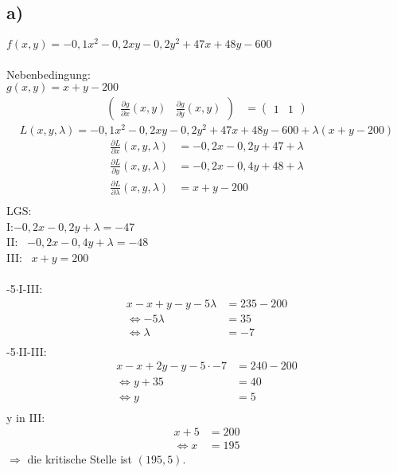 \documentclass[a4paper]{scrartcl}
\begin{document}
\subsection{a)}
\(f(x,y)=-0,1x^2-0,2xy-0,2y^2+47x+48y-600\) \\ \\
Nebenbedingung: \\
\(g(x,y)=x+y-200\) \\
\begin{align}
\begin{pmatrix}
\frac{\partial g}{\partial x}(x,y) & \frac{\partial g}{\partial y}(x,y) 
\end{pmatrix}
&=
\begin{pmatrix}
1 & 1
\end{pmatrix}
\end{align}
\[L(x,y,\lambda)=-0,1x^2-0,2xy-0,2y^2+47x+48y-600+\lambda(x+y-200)\]
\begin{align}
\frac{\partial L}{\partial x}(x,y,\lambda)&=-0,2x-0,2y+47+\lambda \\
\frac{\partial L}{\partial y}(x,y,\lambda)&=-0,2x-0,4y+48+\lambda \\
\frac{\partial L}{\partial \lambda}(x,y,\lambda)&=x+y-200 \\
\end{align}
\newpage
LGS: \\
I:\quad\(-0,2x-0,2y+\lambda = -47\) \\
II: \ \(-0,2x-0,4y+\lambda = -48\) \\
III: \ \quad\quad\quad\quad\quad\(x+y =200\) \\ \\
-5\(\cdot\)I-III:
\begin{align}
x-x+y-y-5\lambda &=235-200 \\
\Leftrightarrow 	-5 \lambda &= 35 \\
\Leftrightarrow 	\lambda &= -7 \\
\end{align}
-5\(\cdot\)II-III:
\begin{align}
x-x+2y-y-5\cdot -7 &= 240-200 \\
\Leftrightarrow	y+35&=40 \\
\Leftrightarrow	y&=5 \\
\end{align}
y in III:
\begin{align}
x+5&=200 \\
\Leftrightarrow x &= 195
\end{align}
\(\Rightarrow\) die kritische Stelle ist \((195,5)\).
\end{document}
